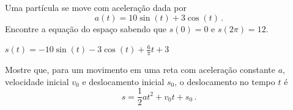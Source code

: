 \begin{exercises}
\begin{exercise}
  Uma partícula se move com aceleração dada por 
  \[
    a(t)= 10 \sin(t)+ 3 \cos(t) \,.
  \]
  Encontre a equação do espaço sabendo que $s(0)=0$ e $s(2\pi)=12$.
  \begin{answer}
    \(
      s(t) =
      - 10\sin(t)
      - 3\cos(t)
      + \frac{6}{\pi} t
      + 3\)
  \end{answer}
\end{exercise}

\begin{exercise}
  Mostre que, para um movimento em uma reta com aceleração constante $a$,
  velocidade inicial $v_0$ e deslocamento inicial $s_0$, 
  o deslocamento no tempo $t$ é
  \[
    s = \frac{1}{2}at^2 + v_0t + s_0 \,.
  \]
\end{exercise}



\end{exercises}
